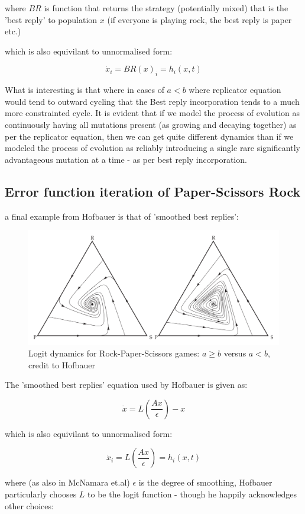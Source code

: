 \documentclass[journal,article,accept,oneauthors,pdftex,10pt,a4paper]{mdpi}
\begin{document}
where $BR$ is function that returns the strategy (potentially mixed) that is the 'best reply' to population $x$ (if everyone is playing rock, the best reply is paper etc.)

which is also equivilant to unnormalised form:

$$ \dot{x}_i=BR(x)_i=h_i(x,t) $$

What is interesting is that where in cases of $a<b$ where replicator equation would tend to outward cycling that the Best reply incorporation tends to a much more constrainted cycle.
It is evident that if we model the process of evolution as continuously having all mutations present (as growing and decaying together) as per the replicator equation, then we can get quite different dynamics than if we modeled the process of evolution as reliably introducing a single rare significantly advantageous mutation at a time - as per best reply incorporation.

\subsection{Error function iteration of Paper-Scissors Rock}

a final example from Hofbauer\cite{psr1} is that of 'smoothed best replies':

\begin{figure}[ht]
\centering
\includegraphics[width=0.8\linewidth]{rps3}
\caption{Logit dynamics for Rock-Paper-Scissors games: $a \ge b$
versus $a < b$, credit to Hofbauer\cite{psr1}}
\label{fig:states}
\end{figure}

The 'smoothed best replies' equation used by Hofbauer\cite{psr1} is given as:

$$ \dot{x}=L\left(\frac{Ax}{\epsilon}\right) -x$$

which is also equivilant to unnormalised form:

$$ \dot{x}_i=L\left(\frac{Ax}{\epsilon}\right)=h_i(x,t) $$

where (as also in McNamara et.al\cite{errors1}) $\epsilon$ is the degree of smoothing, Hofbauer particularly chooses $L$ to be the logit function - though he happily acknowledges other choices:
\end{document}
